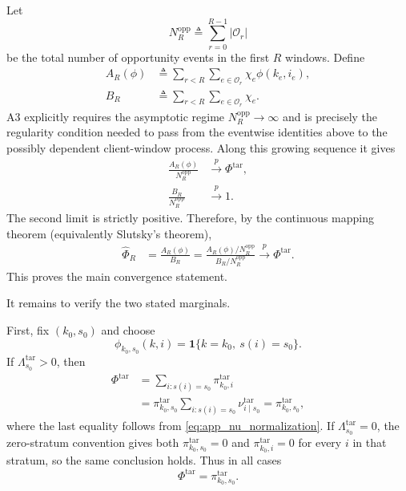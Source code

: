 \documentclass[letterpaper,journal]{IEEEtran}
\begin{document}
Let
\begin{equation}
    N_R^{\mathrm{opp}}
    \triangleq
    \sum_{r=0}^{R-1}|\mathcal{O}_r|
    \label{eq:app_total_opp_events}
\end{equation}
be the total number of opportunity events in the first $R$ windows.  Define
\begin{align}
 A_R(\phi)
 &\triangleq
 \sum_{r<R}
 \sum_{e\in\mathcal{O}_r}
 \chi_e\phi(k_e,i_e),
 \label{eq:app_AR}\\
 B_R
 &\triangleq
 \sum_{r<R}
 \sum_{e\in\mathcal{O}_r}
 \chi_e.
 \label{eq:app_BR}
\end{align}
A3 explicitly requires the asymptotic regime
$N_R^{\mathrm{opp}}\rightarrow\infty$ and is precisely the regularity condition
needed to pass from the eventwise identities above to the possibly dependent
client-window process.  Along this growing sequence it gives
\begin{align}
 \frac{A_R(\phi)}{N_R^{\mathrm{opp}}}
 &\xrightarrow{p}
 \Phi^{\mathrm{tar}},
 \label{eq:app_AR_lln}\\
 \frac{B_R}{N_R^{\mathrm{opp}}}
 &\xrightarrow{p}
 1.
 \label{eq:app_BR_lln}
\end{align}
The second limit is strictly positive.  Therefore, by the continuous mapping
theorem (equivalently Slutsky's theorem),
\begin{align}
 \widehat\Phi_R
 &=
 \frac{A_R(\phi)}{B_R}
 =
 \frac{
 A_R(\phi)/N_R^{\mathrm{opp}}
 }{
 B_R/N_R^{\mathrm{opp}}
 }
 \xrightarrow{p}
 \Phi^{\mathrm{tar}}.
 \label{eq:app_hajek_limit}
\end{align}
This proves the main convergence statement.

It remains to verify the two stated marginals.

First, fix $(k_0,s_0)$ and choose
\begin{equation}
    \phi_{k_0,s_0}(k,i)
    =
    \mathbf{1}\{k=k_0,\ s(i)=s_0\}.
    \label{eq:app_phi_client_stratum}
\end{equation}
If $\Lambda_{s_0}^{\mathrm{tar}}>0$, then
\begin{align}
 \Phi^{\mathrm{tar}}
 &=
 \sum_{i:s(i)=s_0}
 \pi^{\mathrm{tar}}_{k_0,i}
 \nonumber\\
 &=
 \pi^{\mathrm{tar}}_{k_0,s_0}
 \sum_{i:s(i)=s_0}
 \nu^{\mathrm{tar}}_{i\mid s_0}
 =
 \pi^{\mathrm{tar}}_{k_0,s_0},
 \label{eq:app_recover_client_stratum_positive}
\end{align}
where the last equality follows from
\eqref{eq:app_nu_normalization}.  If
$\Lambda_{s_0}^{\mathrm{tar}}=0$, the zero-stratum convention gives both
$\pi^{\mathrm{tar}}_{k_0,s_0}=0$ and
$\pi^{\mathrm{tar}}_{k_0,i}=0$ for every $i$ in that stratum, so the same
conclusion holds.  Thus in all cases
\begin{equation}
 \Phi^{\mathrm{tar}}
 =\pi^{\mathrm{tar}}_{k_0,s_0}.
 \label{eq:app_recover_client_stratum}
\end{equation}
\end{document}
